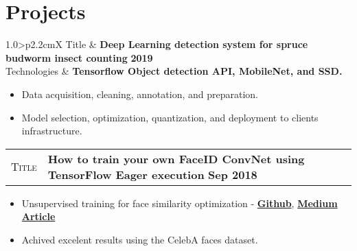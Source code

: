 \documentclass[9pt, a4paper, oneside, final]{scrartcl} %
\newcommand{\gray}{\rowcolor[gray]{.90}} %
\begin{document}
%


\section{Projects}

\begin{center}
\begin{tabularx}{1.0\linewidth}{>{\raggedleft\scshape}p{2.2cm}X}
\gray Title & \textbf{Deep Learning detection system for spruce budworm insect counting} \hfill \textbf{2019}\\
\gray Technologies & \textbf{Tensorflow Object detection API, MobileNet, and SSD.}
\end{tabularx}
\end{center}

\begin{itemize}\itemsep1.2pt \parskip1.5pt 
\item Data acquisition, cleaning, annotation, and preparation. 
\item Model selection, optimization, quantization, and deployment to clients infrastructure. 
\end{itemize}


\begin{center}
\begin{tabularx}{1.0\linewidth}{>{\raggedleft\scshape}p{2.2cm}X}
\gray Title & \textbf{How to train your own FaceID ConvNet using TensorFlow Eager execution} \hfill \textbf{Sep 2018}\\
\end{tabularx}
\end{center}

\begin{itemize}\itemsep1.2pt \parskip0pt 
\item Unsupervised training for face similarity optimization - \textbf{\href{https://github.com/sthalles/face-similarity}{Github}}, \textbf{\href{https://medium.com/free-code-camp/how-to-train-your-own-faceid-cnn-using-tensorflow-eager-execution-6905afe4fd5a?source=friends_link&sk=f366d6fdad9dfda8ac2337ca28912f49}{Medium Article}} 
\item Achived excelent results using the CelebA faces dataset.
\end{itemize}
\end{document}
